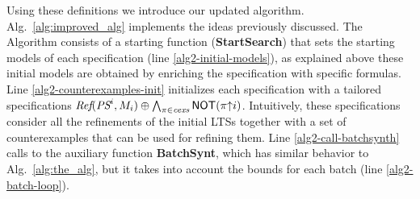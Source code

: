 Using these definitions we introduce our updated algorithm.  Alg.~\ref{alg:improved_alg} implements the ideas previously discussed.  The Algorithm consists of a starting function (\textbf{StartSearch}) that sets the starting models of each specification (line \ref{alg2-initial-models}), as explained above these initial models are obtained by enriching the specification with specific formulas.  Line \ref{alg2-counterexamples-init}
initializes each specification with a tailored specifications $\textit{Ref}(\textit{PS}^i,M_i) \oplus \bigwedge_{\pi \in \textit{cexs}} \mathsf{NOT}(\pi{\uparrow}i)$.  Intuitively, these specifications consider all the refinements of the initial LTSs together with a set of counterexamples that can be used for refining them.  Line \ref{alg2-call-batchsynth} calls to the auxiliary function \textbf{BatchSynt}, which has similar behavior to Alg.~\ref{alg:the_alg}, but it takes into account the bounds for each batch  (line \ref{alg2-batch-loop}).
